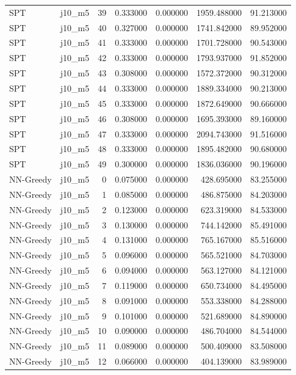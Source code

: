 \begin{tabular}{llrrrrr}
SPT & j10_m5 & 39 & 0.333000 & 0.000000 & 1959.488000 & 91.213000 \\
SPT & j10_m5 & 40 & 0.327000 & 0.000000 & 1741.842000 & 89.952000 \\
SPT & j10_m5 & 41 & 0.333000 & 0.000000 & 1701.728000 & 90.543000 \\
SPT & j10_m5 & 42 & 0.333000 & 0.000000 & 1793.937000 & 91.852000 \\
SPT & j10_m5 & 43 & 0.308000 & 0.000000 & 1572.372000 & 90.312000 \\
SPT & j10_m5 & 44 & 0.333000 & 0.000000 & 1889.334000 & 90.213000 \\
SPT & j10_m5 & 45 & 0.333000 & 0.000000 & 1872.649000 & 90.666000 \\
SPT & j10_m5 & 46 & 0.308000 & 0.000000 & 1695.393000 & 89.160000 \\
SPT & j10_m5 & 47 & 0.333000 & 0.000000 & 2094.743000 & 91.516000 \\
SPT & j10_m5 & 48 & 0.333000 & 0.000000 & 1895.482000 & 90.680000 \\
SPT & j10_m5 & 49 & 0.300000 & 0.000000 & 1836.036000 & 90.196000 \\
NN-Greedy & j10_m5 & 0 & 0.075000 & 0.000000 & 428.695000 & 83.255000 \\
NN-Greedy & j10_m5 & 1 & 0.085000 & 0.000000 & 486.875000 & 84.203000 \\
NN-Greedy & j10_m5 & 2 & 0.123000 & 0.000000 & 623.319000 & 84.533000 \\
NN-Greedy & j10_m5 & 3 & 0.130000 & 0.000000 & 744.142000 & 85.491000 \\
NN-Greedy & j10_m5 & 4 & 0.131000 & 0.000000 & 765.167000 & 85.516000 \\
NN-Greedy & j10_m5 & 5 & 0.096000 & 0.000000 & 565.521000 & 84.703000 \\
NN-Greedy & j10_m5 & 6 & 0.094000 & 0.000000 & 563.127000 & 84.121000 \\
NN-Greedy & j10_m5 & 7 & 0.119000 & 0.000000 & 650.734000 & 84.495000 \\
NN-Greedy & j10_m5 & 8 & 0.091000 & 0.000000 & 553.338000 & 84.288000 \\
NN-Greedy & j10_m5 & 9 & 0.101000 & 0.000000 & 521.689000 & 84.890000 \\
NN-Greedy & j10_m5 & 10 & 0.090000 & 0.000000 & 486.704000 & 84.544000 \\
NN-Greedy & j10_m5 & 11 & 0.089000 & 0.000000 & 500.409000 & 83.508000 \\
NN-Greedy & j10_m5 & 12 & 0.066000 & 0.000000 & 404.139000 & 83.989000 \\

\end{tabular}
